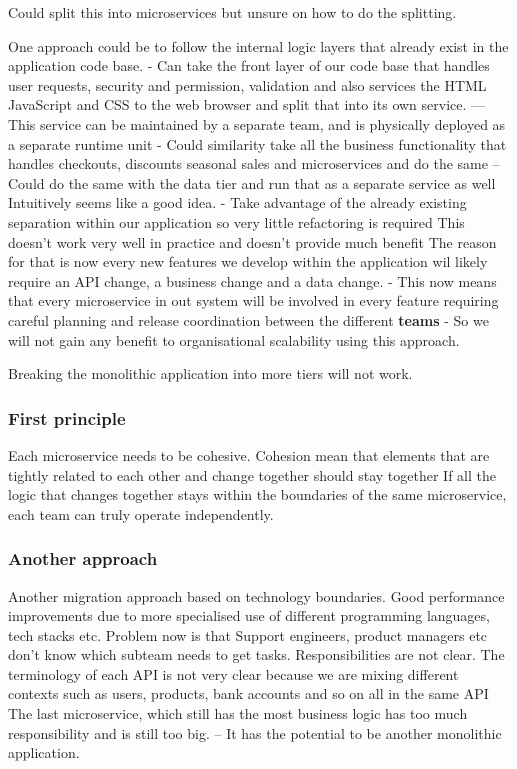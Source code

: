 \documentclass[a4paper, 11pt]{book}
\begin{document}
    Could split this into microservices but unsure on how to do the splitting.

    One approach could be to follow the internal logic layers that already exist in the application code base.
    - Can take the front layer of our code base that handles user requests, security and permission, validation and also services the HTML JavaScript and CSS to the web browser and split that into its own service.
    --- This service can be maintained by a separate team, and is physically deployed as a separate runtime unit
    - Could similarity take all the business functionality that handles checkouts, discounts seasonal sales and microservices and do the same
    -- Could do the same with the data tier and run that as a separate service as well
    Intuitively seems like a good idea.
    - Take advantage of the already existing separation within our application so very little refactoring is required
    This doesn't work very well in practice and doesn't provide much benefit
    The reason for that is now every new features we develop within the application wil likely require an API change, a business change and a data change.
    - This now means that every microservice in out system will be involved in every feature requiring careful planning and release coordination between the different \textbf{teams}
    - So we will not gain any benefit to organisational scalability using this approach.

    Breaking the monolithic application into more tiers will not work.

    \subsubsection{First principle}
    Each microservice needs to be cohesive.
    Cohesion mean that elements that are tightly related to each other and change together should stay together
    If all the logic that changes together stays within the boundaries of the same microservice, each team can truly operate independently.

    \subsubsection{Another approach}
    Another migration approach based on technology boundaries.
    Good performance improvements due to more specialised use of different programming languages, tech stacks etc.
    Problem now is that Support engineers, product managers etc don't know which subteam needs to get tasks.
    Responsibilities are not clear.
    The terminology of each API is not very clear because we are mixing different contexts such as users, products, bank accounts and so on all in the same API
    The last microservice, which still has the most business logic has too much responsibility and is still too big.
    -- It has the potential to be another monolithic application.
\end{document}
